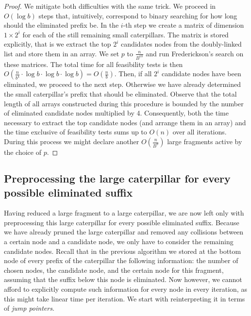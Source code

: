 \documentclass[11pt,a4paper]{article}
\theoremstyle{definition}
\theoremstyle{remark}
\begin{document}
\begin{proof}
We mitigate both difficulties with the same trick. We proceed in $O(\log b)$ steps that, intuitively, correspond
to binary searching for how long should the eliminated prefix be. In the $i$-th step we
create a matrix of dimension $1\times 2^{i}$ for each of the still remaining small caterpillars.
The matrix is stored explicitly, that is we extract the top $2^{i}$ candidates nodes from the doubly-linked
list and store them in an array. We set $p$ to $\frac{n}{B^{10}}$ and run Frederickson's search
on these matrices. The total time for all feasibility tests is then
$O(\frac{n}{b^{4}}\cdot \log b \cdot \log b \cdot \log b) = O(\frac{n}{b})$. 
Then, if all $2^{i}$ candidate nodes have been eliminated, we proceed to the next
step. Otherwise we have already determined the small caterpillar's prefix that should be eliminated.
Observe that the total length of all arrays constructed during this procedure is bounded by the number
of eliminated candidate nodes multiplied by 4. Consequently, both the time necessary
to extract the top candidate nodes (and arrange them in an array) and the time exclusive of feasibility tests sums up to $O(n)$
over all iterations. During this process we might declare another $O(\frac{n}{B^9})$ large fragments active
by the choice of $p$.
\end{proof}


\subsection{Preprocessing the large caterpillar for every possible eliminated suffix}\label{section:lemma4}

Having reduced a large fragment to a large caterpillar, we are now left only with preprocessing this large caterpillar for every possible eliminated suffix.
Because we have already pruned the large caterpillar and removed any collisions between a certain
node and a candidate node, we only have to consider the remaining candidate nodes.
Recall that in the previous algorithm we stored at the bottom node of every prefix of the caterpillar
the following information: the number of chosen nodes, the candidate node, and the certain node for this fragment,
assuming that the suffix below this node is eliminated. Now however, we cannot afford to explicitly
compute such information for every node in every iteration,
as this might take linear time per iteration. We start with reinterpreting it in terms of
\emph{jump pointers}. 
\end{document}
